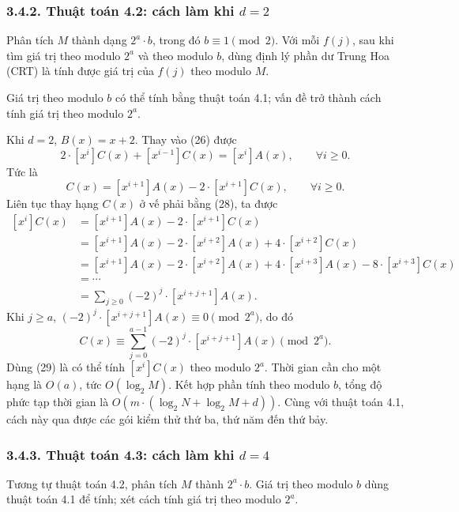 \documentclass[11pt]{article}
\begin{document}
\subsubsection*{3.4.2. Thuật toán 4.2: cách làm khi \(d=2\)}

Phân tích \(M\) thành dạng \(2^a\cdot b\), trong đó \(b\equiv1\pmod2\). Với
mỗi \(f(j)\), sau khi tìm giá trị theo modulo \(2^a\) và theo modulo \(b\),
dùng định lý phần dư Trung Hoa (CRT) là tính được giá trị của \(f(j)\) theo
modulo \(M\).

Giá trị theo modulo \(b\) có thể tính bằng thuật toán 4.1; vấn đề trở thành
cách tính giá trị theo modulo \(2^a\).

Khi \(d=2\), \(B(x)=x+2\). Thay vào (26) được
\[
  2\cdot[x^i]C(x)+[x^{i-1}]C(x)=[x^i]A(x),\qquad \forall i\ge0.
\]
Tức là
\begin{equation*}
  [x^i]C(x)=[x^{i+1}]A(x)-2\cdot[x^{i+1}]C(x),\qquad \forall i\ge0.
  \tag{28}
\end{equation*}
Liên tục thay hạng \(C(x)\) ở vế phải bằng (28), ta được
\[
\begin{aligned}
  [x^i]C(x)
  &= [x^{i+1}]A(x)-2\cdot[x^{i+1}]C(x)\\
  &= [x^{i+1}]A(x)-2\cdot[x^{i+2}]A(x)
     +4\cdot[x^{i+2}]C(x)\\
  &= [x^{i+1}]A(x)-2\cdot[x^{i+2}]A(x)
     +4\cdot[x^{i+3}]A(x)-8\cdot[x^{i+3}]C(x)\\
  &= \cdots\\
  &= \sum_{j\ge0}(-2)^j\cdot[x^{i+j+1}]A(x).
\end{aligned}
\]
Khi \(j\ge a\), \((-2)^j\cdot[x^{i+j+1}]A(x)\equiv0\pmod {2^a}\), do đó
\begin{equation*}
  [x^i]C(x)\equiv\sum_{j=0}^{a-1}(-2)^j\cdot[x^{i+j+1}]A(x)\pmod {2^a}.
  \tag{29}
\end{equation*}
Dùng (29) là có thể tính \([x^i]C(x)\) theo modulo \(2^a\). Thời gian cần cho
một hạng là \(O(a)\), tức \(O(\log_2 M)\). Kết hợp phần tính theo modulo
\(b\), tổng độ phức tạp thời gian là
\(O(m\cdot(\log_2 N+\log_2 M+d))\). Cùng với thuật toán 4.1, cách này qua
được các gói kiểm thử thứ ba, thứ năm đến thứ bảy.

\subsubsection*{3.4.3. Thuật toán 4.3: cách làm khi \(d=4\)}

Tương tự thuật toán 4.2, phân tích \(M\) thành \(2^a\cdot b\). Giá trị theo
modulo \(b\) dùng thuật toán 4.1 để tính; xét cách tính giá trị theo modulo
\(2^a\).
\end{document}
